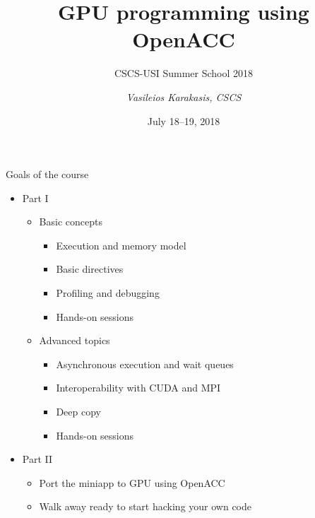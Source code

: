 \documentclass[12pt,aspectratio=169]{beamer}
\author{\emph{Vasileios Karakasis, CSCS}}
\title{GPU programming using OpenACC}
\subtitle{CSCS-USI Summer School 2018}
\date{July 18--19, 2018}
\begin{document}
\cscstitle

\begin{frame}{Goals of the course}
  \begin{itemize}
  \item Part I
    \begin{itemize}
    \item Basic concepts
      \begin{itemize}
      \item Execution and memory model
      \item Basic directives
      \item Profiling and debugging
      \item Hands-on sessions
      \end{itemize}
    \item Advanced topics
      \begin{itemize}
      \item Asynchronous execution and wait queues
      \item Interoperability with CUDA and MPI
      \item Deep copy
      \item Hands-on sessions
      \end{itemize}
    \end{itemize}
  \item  Part II
    \begin{itemize}
    \item Port the miniapp to GPU using OpenACC
    \item Walk away ready to start hacking your own code
    \end{itemize}
  \end{itemize}
\end{frame}

\end{document}
